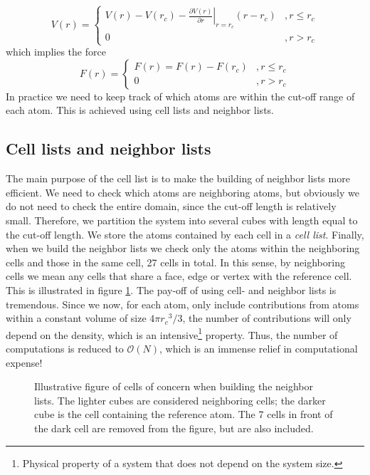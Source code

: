 \documentclass[twoside,english]{uiofysmaster}
\begin{document}
\begin{equation}
	V(r) = 
	\begin{cases}
		\left.V(r) - V(r_c) - \frac{\partial V(r)}{\partial r}\right\rvert_{r=r_c} (r-r_c) &, r\leq r_c \\
		0 &, r>r_c 
	\end{cases}
	\label{eq:truncation}
\end{equation}
which implies the force
\begin{equation}
F(r) = 
\begin{cases}
F(r) = F(r) - F(r_c) &, r\leq r_c \\
0 &, r>r_c 
\end{cases}
\end{equation}
In practice we need to keep track of which atoms are within the cut-off range of each atom. 
This is achieved using cell lists and neighbor lists. 

\subsection{Cell lists and neighbor lists}
The main purpose of the cell list is to make the building of neighbor lists more efficient. 
We need to check which atoms are neighboring atoms, but obviously we do not need to check the entire domain, since the cut-off length is relatively small. 
Therefore, we partition the system into several cubes with length equal to the cut-off length. 
We store the atoms contained by each cell in a \textit{cell list}. 
Finally, when we build the neighbor lists we check only the atoms within the neighboring cells and those in the same cell, 27 cells in total. 
In this sense, by neighboring cells we mean any cells that share a face, edge or vertex with the reference cell. 
This is illustrated in figure \ref{fig:neighbourcells}.
The pay-off of using cell- and neighbor lists is tremendous. 
Since we now, for each atom, only include contributions from atoms within a constant volume of size $4\pi {r_c}^3/3$, 
the number of contributions will only depend on the density, which is an intensive\footnote{Physical property of a system that does not depend on the system size.} property. 
Thus, the number of computations is reduced to $\mathcal{O} (N)$, which is an immense relief in computational expense!

\begin{figure}
	\center
	\resizebox{0.45\linewidth}{!}{
		
	}
	\caption{Illustrative figure of cells of concern when building the neighbor lists. The lighter cubes are considered neighboring cells; the darker cube is the cell containing the reference atom. The 7 cells in front of the dark cell are removed from the figure, but are also included. }
	\label{fig:neighbourcells}
\end{figure}
\end{document}
